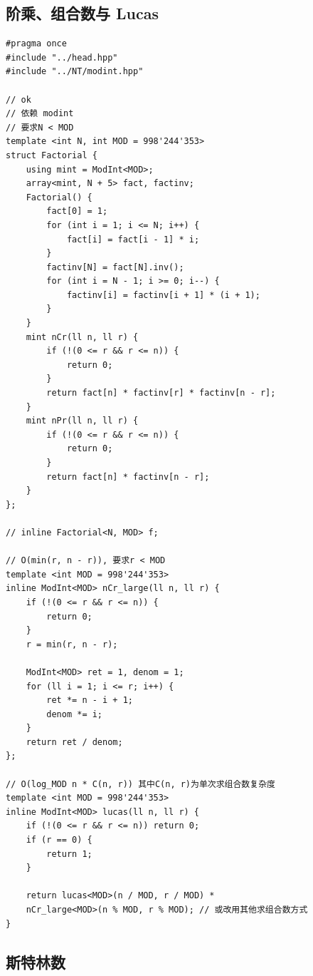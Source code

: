 \subsection{阶乘、组合数与 Lucas}
\par

\begin{lstlisting}
#pragma once
#include "../head.hpp"
#include "../NT/modint.hpp"

// ok
// 依赖 modint
// 要求N < MOD
template <int N, int MOD = 998'244'353>
struct Factorial {
    using mint = ModInt<MOD>;
    array<mint, N + 5> fact, factinv;
    Factorial() {
        fact[0] = 1;
        for (int i = 1; i <= N; i++) {
            fact[i] = fact[i - 1] * i;
        }
        factinv[N] = fact[N].inv();
        for (int i = N - 1; i >= 0; i--) {
            factinv[i] = factinv[i + 1] * (i + 1);
        }
    }
    mint nCr(ll n, ll r) {
        if (!(0 <= r && r <= n)) {
            return 0;
        }
        return fact[n] * factinv[r] * factinv[n - r];
    }
    mint nPr(ll n, ll r) {
        if (!(0 <= r && r <= n)) {
            return 0;
        }
        return fact[n] * factinv[n - r];
    }
};

// inline Factorial<N, MOD> f;

// O(min(r, n - r)), 要求r < MOD
template <int MOD = 998'244'353>
inline ModInt<MOD> nCr_large(ll n, ll r) {
    if (!(0 <= r && r <= n)) {
        return 0;
    }
    r = min(r, n - r);

    ModInt<MOD> ret = 1, denom = 1;
    for (ll i = 1; i <= r; i++) {
        ret *= n - i + 1;
        denom *= i;
    }
    return ret / denom;
};

// O(log_MOD n * C(n, r)) 其中C(n, r)为单次求组合数复杂度
template <int MOD = 998'244'353>
inline ModInt<MOD> lucas(ll n, ll r) {
    if (!(0 <= r && r <= n)) return 0;
    if (r == 0) {
        return 1;
    }

    return lucas<MOD>(n / MOD, r / MOD) * 
    nCr_large<MOD>(n % MOD, r % MOD); // 或改用其他求组合数方式
}
\end{lstlisting}

\subsection{斯特林数}
\par

